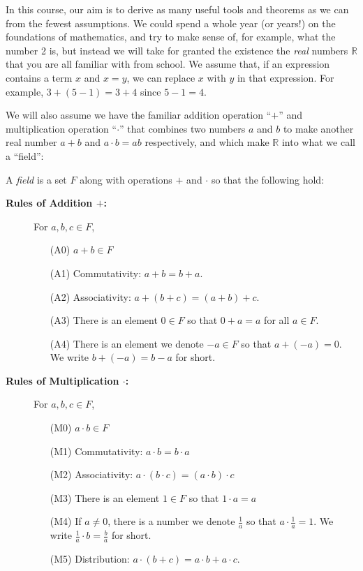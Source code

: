 \documentclass[11pt,dvipsnames]{book}
\numberwithin{figure}{section} %
\numberwithin{table}{section} %
\begin{document}
In this course, our aim is to derive as many useful tools and theorems as we can from the fewest assumptions. We could spend a whole year (or years!) on the foundations of mathematics, and try to make sense of, for example, what the number 2 is, but instead we will take for granted the existence the {\it real} numbers $\mathbb{R}$ that you are all familiar with from school. We assume that, if an expression contains a term $x$ and $x=y$, we can replace $x$ with $y$ in that expression.  For example, $3+(5-1)=3+4$ since $5-1=4$.

We will also assume we have the familiar addition operation ``$+$'' and multiplication operation ``$\cdot$''  that combines two numbers $a$ and $b$ to make another real number $a+b$ and $a\cdot b=ab$ respectively, and which make $\mathbb{R}$ into what we call a ``field'':

\begin{definition}
A {\it field} is a set $F$ along with operations $+$ and $\cdot$ so that the following hold:\\

\begin{description}
\item[{\bf Rules of Addition $+$:}] For $a,b,c\in F$,
\begin{itemize}%
\item[(A0)] $a+b\in F$
\item[(A1)] Commutativity: $a+b=b+a$.
\item[(A2)] Associativity: $a+(b+c)=(a+b)+c$.
\item[(A3)] There is an element $0\in F$ so that $0+a=a$ for all $a\in F$.
\item[(A4)] There is an element we denote $-a\in F $ so that $a+(-a)=0$. We write $b+(-a)=b-a$ for short.
\end{itemize}
\end{description}

\begin{description}
\item[{\bf Rules of Multiplication $\cdot$:}] For $a,b,c\in F$,
\begin{itemize}%
\item[(M0)] $a\cdot b\in F$
\item[(M1)] Commutativity: $a\cdot b=b\cdot a$
\item[(M2)] Associativity: $a\cdot (b\cdot c)=(a\cdot b)\cdot c$
\item[(M3)] There is an element $1\in F$ so that $1\cdot a=a$
\item[(M4)] If $a\neq 0$, there is a number we denote $\frac{1}{a}$ so that $a\cdot\frac{1}{a}=1$. We write $\frac{1}{a}\cdot b=\frac{b}{a}$ for short.
\item[(M5)] Distribution: $a\cdot (b+c)=a\cdot b+a\cdot c$.
\end{itemize}
\end{description}
\end{definition}
\end{document}

